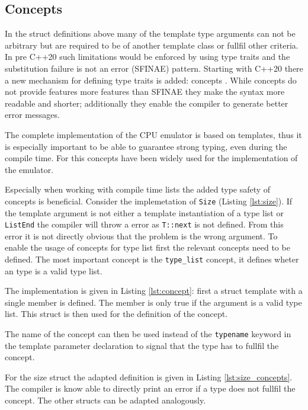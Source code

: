 

\subsection{Concepts}
In the struct definitions above many of the template type arguments can not be arbitrary
but are required to be of another template class or fullfil other criteria. In pre C++20
such limitations would be enforced by using type traits and the substitution failure is 
not an error (SFINAE) pattern.
Starting with C++20 there a new mechanism for defining type traits is added: concepts \cite{concepts}.
While concepts do not provide features more features than SFINAE
they make the syntax more readable and shorter; additionally they enable the compiler to
generate better error messages.

The complete implementation of the CPU emulator is based on templates, thus it is especially important to be able to guarantee strong typing, even during the compile time. For this
concepts have been widely used for the implementation of the emulator.

Especially when working with compile time lists the added type safety of concepts is
beneficial. Consider the implemetation of \lstinline{Size} (Listing \ref{lst:size}).
If the template argument is not either a template instantiation of a type list or 
\lstinline{ListEnd} the compiler will throw a error as \lstinline{T::next} is not
defined. From this error it is not directly obvious that the problem is the wrong
argument. To enable the usage of concepts for type list first the relevant concepts
need to be defined. The most important concept is the \lstinline{type_list} concept,
it defines wheter an type is a valid type list.

The implementation is given in Listing \ref{lst:concept}: first a struct template with
a single member is defined. The member is only true if the argument is a valid type list.
This struct is then used for the definition of the concept.



The name of the concept can then be used instead of the \lstinline{typename} keyword 
in the template parameter declaration to  signal that the type has to fullfil the concept. 

For the size struct the adapted definition is given in Listing \ref{lst:size_concepts}. The compiler is know able to directly print an error if a type does not fullfil the concept.
The other structs can be adapted analogously.



